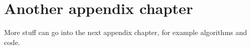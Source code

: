 \chapter{Another appendix chapter}

More stuff can go into the next appendix chapter, for example algorithms and code.